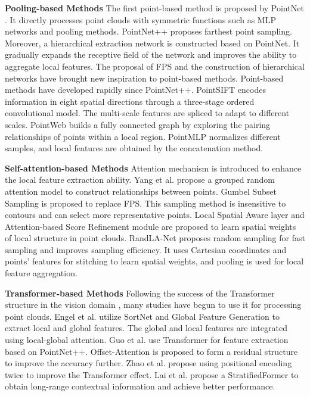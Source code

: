 \documentclass[10pt,twocolumn,letterpaper]{article}
\begin{document}
    \textbf{Pooling-based Methods}  The first point-based method is proposed by PointNet \cite{12Charles_2017}. It directly processes point clouds with symmetric functions such as MLP networks and pooling methods. PointNet++ \cite{13Charles_2017} proposes farthest point sampling. Moreover, a hierarchical extraction network is constructed based on PointNet. It gradually expands the receptive field of the network and improves the ability to aggregate local features. The proposal of FPS and the construction of hierarchical networks have brought new inspiration to point-based methods. Point-based methods have developed rapidly since PointNet++. PointSIFT \cite{26} encodes information in eight spatial directions through a three-stage ordered convolutional model. The multi-scale features are spliced to adapt to different scales. PointWeb \cite{23Zhao_2019} builds a fully connected graph by exploring the pairing relationships of points within a local region. PointMLP \cite{27} normalizes different samples, and local features are obtained by the concatenation method.

    \textbf{Self-attention-based Methods}  Attention mechanism \cite{28} is introduced to enhance the local feature extraction ability. Yang et al. \cite{22Yang_2019} propose a grouped random attention model to construct relationships between points. Gumbel Subset Sampling is proposed to replace FPS. This sampling method is insensitive to contours and can select more representative points. Local Spatial Aware layer \cite{29} and Attention-based Score Refinement module \cite{30Zhao_2019} are proposed to learn spatial weights of local structure in point clouds. RandLA-Net \cite{15Hu_2020} proposes random sampling for fast sampling and improves sampling efficiency. It uses Cartesian coordinates and points' features for stitching to learn spatial weights, and pooling is used for local feature aggregation.

    \textbf{Transformer-based Methods}  Following the success of the Transformer structure in the vision domain \cite{31Thomas_2019,32Carion_2020,33nbcaaa,34qq,35qq,36Liu_2021,37Mao_2021,38qq,Touvron,40Touvron_2021,41Wang_2022}, many studies \cite{24Zhao_2021,42Engel_2021,43Guo_2021,44qq} have begun to use it for processing point clouds. Engel et al. \cite{42Engel_2021} utilize SortNet and Global Feature Generation to extract local and global features. The global and local features are integrated using local-global attention. Guo et al. \cite{43Guo_2021} use Transformer for feature extraction based on PointNet++. Offset-Attention is proposed to form a residual structure to improve the accuracy further. Zhao et al. \cite{24Zhao_2021} propose using positional encoding twice to improve the Transformer effect. Lai et al. \cite{44qq} propose a StratifiedFormer to obtain long-range contextual information and achieve better performance.
\end{document}
